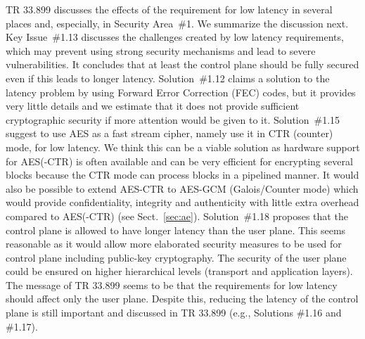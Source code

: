 \documentclass[lnicst,sechang,a4paper]{svmultln}
\begin{document}
TR 33.899 discusses the effects of the requirement for low latency in several places and, especially, in Security Area~\#1. We summarize the discussion next. 
Key Issue~\#1.13 discusses the challenges created by low latency requirements, which  may prevent using strong security mechanisms and lead to severe vulnerabilities. It concludes that at least the control plane should be fully secured even if this leads to longer latency. 
Solution~\#1.12 claims a solution to the latency problem by using Forward Error Correction (FEC) codes, but it provides very little details and we estimate that it does not provide sufficient cryptographic security if more attention would be given to it. 
Solution~\#1.15 suggest to use AES as a fast stream cipher, namely use it in CTR (counter) mode, for low latency. We think this can be a viable solution as hardware support for AES(-CTR) is often available and can be very efficient for encrypting several blocks because the CTR mode can process blocks in a pipelined manner. %
It would also be possible to extend AES-CTR to AES-GCM (Galois/Counter mode) which would provide confidentiality, integrity and authenticity with little extra overhead compared to AES(-CTR) (see Sect.~\ref{sec:ae}).
Solution~\#1.18 proposes that the control plane is allowed to have longer latency than the user plane. This seems reasonable as it would allow more elaborated security measures to be used for control plane including public-key cryptography. The security of the user plane could be ensured on higher hierarchical levels (transport and application layers). %
The message of TR 33.899 seems to be that the requirements for low latency should affect only the user plane. Despite this, reducing the latency of the control plane is still important and discussed in TR 33.899 (e.g., Solutions \#1.16 and \#1.17).
\end{document}
